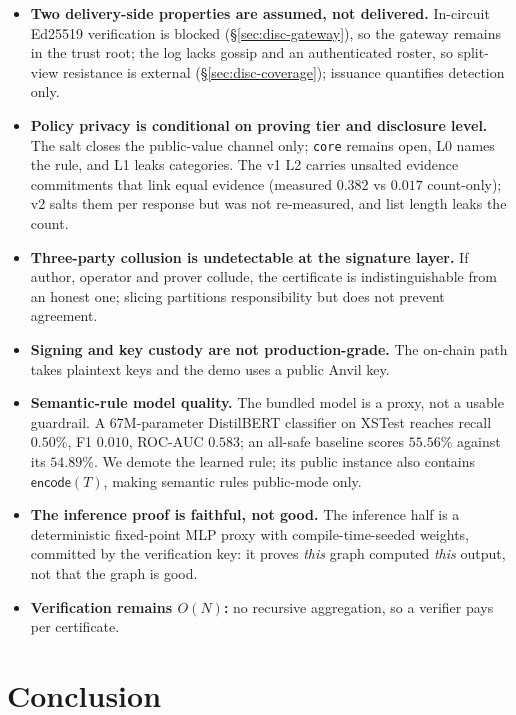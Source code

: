 \documentclass[10pt,journal,compsoc]{IEEEtran}
\begin{document}
\begin{itemize}
  \item \textbf{Two delivery-side properties are assumed, not delivered.}
    In-circuit Ed25519 verification is blocked (\S\ref{sec:disc-gateway}), so
    the gateway remains in the trust root; the log lacks gossip and an
    authenticated roster, so split-view resistance is external
    (\S\ref{sec:disc-coverage}); issuance quantifies detection only.
  \item \textbf{Policy privacy is conditional on proving tier and disclosure
    level.} The salt closes the public-value channel only; \texttt{core} remains
    open, L0 names the rule, and L1 leaks categories. The v1 L2 carries
    unsalted evidence commitments that link equal evidence (measured $0.382$ vs
    $0.017$ count-only); v2 salts them per response but was not re-measured, and
    list length leaks the count.
  \item \textbf{Three-party collusion is undetectable at the signature layer.}
    If author, operator and prover collude, the certificate is
    indistinguishable from an honest one; slicing partitions responsibility but
    does not prevent agreement.
  \item \textbf{Signing and key custody are not production-grade.} The on-chain
    path takes plaintext keys and the demo uses a public Anvil key.
  \item \textbf{Semantic-rule model quality.} The bundled model is a proxy,
    not a usable guardrail. A 67M-parameter DistilBERT classifier on XSTest
    reaches recall $0.50\%$, F1 $0.010$, ROC-AUC $0.583$; an all-safe baseline
    scores $55.56\%$ against its $54.89\%$. We demote the learned rule; its
    public instance also contains $\mathsf{encode}(T)$, making semantic rules
    public-mode only.
  \item \textbf{The inference proof is faithful, not good.} The inference half
    is a deterministic fixed-point MLP proxy with compile-time-seeded weights,
    committed by the verification key: it proves \emph{this} graph computed
    \emph{this} output, not that the graph is good.
  \item \textbf{Verification remains $O(N)$:} no recursive aggregation, so a
    verifier pays per certificate.
\end{itemize}

\section{Conclusion}
\label{sec:conclusion}
\end{document}
